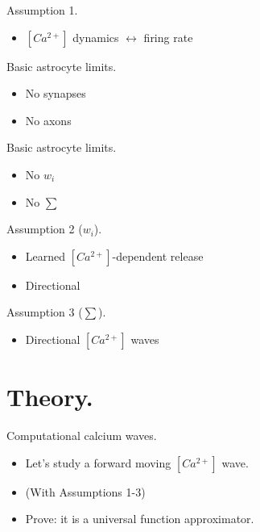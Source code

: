 \documentclass[10pt]{beamer}
\begin{document}
\begin{frame}[fragile]{Assumption 1.}
\begin{itemize}
    \item $[Ca^{2+}]$ dynamics $\leftrightarrow$ firing rate
\end{itemize}
\end{frame}

\begin{frame}[fragile]{Basic astrocyte limits.}
\begin{itemize}
    \item No synapses
    \item No axons 
\end{itemize}
\end{frame}

\begin{frame}[fragile]{Basic astrocyte limits.}
\begin{itemize}
    \item No $w_i$
    \item No $\sum$
\end{itemize}
\end{frame}

\begin{frame}[fragile]{Assumption 2 ($w_i$).}
\begin{itemize}
    \item Learned $[Ca^{2+}]$-dependent release
    \item Directional
\end{itemize}
\end{frame}
\begin{frame}[fragile]{Assumption 3 ($\sum$).}
\begin{itemize}
    \item Directional $[Ca^{2+}]$ waves
\end{itemize}
\end{frame}

\section[In theory.]{Theory.}
\begin{frame}[fragile]{Computational calcium waves.}
\begin{itemize}
\item Let's study a forward moving $[Ca^{2+}]$ wave.
\item (With Assumptions 1-3)
\item \alert{Prove}: it is a universal function approximator.
\end{itemize}
\end{frame}
\end{document}
